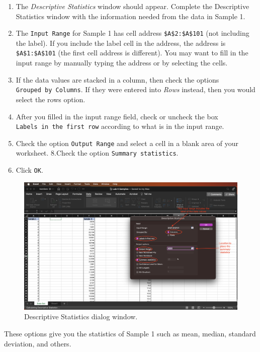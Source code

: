 \documentclass[
]{book}
\providecommand{\tightlist}{%
  \setlength{\itemsep}{0pt}\setlength{\parskip}{0pt}}
\begin{document}
\begin{enumerate}
\def\labelenumi{\arabic{enumi}.}
\setcounter{enumi}{2}
\tightlist
\item
  The \emph{Descriptive Statistics} window should appear. Complete the Descriptive Statistics window with the information needed from the data in Sample 1.
\item
  The \texttt{Input\ Range} for Sample 1 has cell address \texttt{\$A\$2:\$A\$101} (not including the label). If you include the label cell in the address, the address is \texttt{\$A\$1:\$A\$101} (the first cell address is different). You may want to fill in the input range by manually typing the address or by selecting the cells.
\item
  If the data values are stacked in a column, then check the options \texttt{Grouped\ by\ Columns}. If they were entered into \emph{Rows} instead, then you would select the rows option.
\item
  After you filled in the input range field, check or uncheck the box \texttt{Labels\ in\ the\ first\ row} according to what is in the input range.
\item
  Check the option \texttt{Output\ Range} and select a cell in a blank area of your worksheet.
  8.Check the option \texttt{Summary\ statistics}.
\item
  Click \texttt{OK}.
\end{enumerate}

\begin{figure}

{\centering \includegraphics[width=0.8\linewidth]{images/descriptive-stats2} 

}

\caption{Descriptive Statistics dialog window.}\label{fig:descriptive-stats2}
\end{figure}

These options give you the statistics of Sample 1 such as mean, median, standard deviation, and others.
\end{document}
